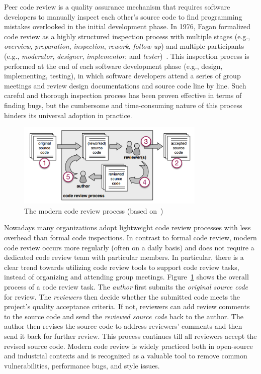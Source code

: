 \documentclass[runningheads,a4paper]{llncs}
\begin{document}
Peer code review is a quality assurance mechanism that requires software developers to manually inspect each other's source code to find programming mistakes overlooked in the initial development phase. In 1976, Fagan formalized code review as a highly structured inspection process with multiple stages (e.g., {\em overview}, {\em preparation}, {\em inspection}, {\em rework}, {\em follow-up}) and multiple participants (e.g., {\em moderator}, {\em designer}, {\em implementor}, and {\em tester})~\cite{fagan2001design}. This inspection process is performed at the end of each software development phase (e.g., design, implementing, testing), in which software developers attend a series of group meetings and review design documentations and source code line by line. Such careful and thorough inspection process has been proven effective in terms of finding bugs, but the cumbersome and time-consuming nature of this process hinders its universal adoption in practice. 


\begin{figure}[ht]
 \centering
 \includegraphics[width=0.8\textwidth]{images/review-process.png}
 \caption{The modern code review process (based on~\cite{beller2014modern})}
 \label{fig:review-process}
\end{figure}

Nowadays many organizations adopt lightweight code review processes with less overhead than formal code inspections. In contrast to formal code review, modern code review occurs more regularly (often on a daily basis) and does not require a dedicated code review team with particular members. In particular, there is a clear trend towards utilizing code review tools to support code review tasks, instead of organizing and attending group meetings. Figure~\ref{fig:review-process} shows the overall process of a code review task. The {\em author} first submits the {\em original source code} for review. The {\em reviewers} then decide whether the submitted code meets the project's quality acceptance criteria. If not, reviewers can add review comments to the source code and send the {\em reviewed source code} back to the author. The author then revises the source code to address reviewers' comments and then send it back for further review. This process continues till all reviewers accept the revised source code. Modern code review is widely practiced both in open-source and industrial contexts and is recognized as a valuable tool to remove common vulnerabilities, performance bugs, and style issues. 
\end{document}
